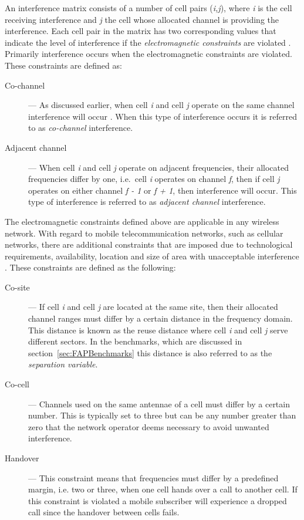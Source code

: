 An interference matrix consists of a number of cell pairs (\emph{i,j}), where \emph{i} is the cell receiving interference and \emph{j} the cell whose allocated channel is providing the interference\cite{Karen2004}. Each cell pair in the matrix has two corresponding values that indicate the level of interference if the \emph{electromagnetic constraints} are violated \cite{ACOvsEA,AndreasPaper}. 
Primarily interference occurs when the electromagnetic constraints are violated. These constraints are defined as:
\begin{description}
\item[Co-channel] --- As discussed earlier, when cell \emph{i} and cell \emph{j} operate on the same channel interference will occur \cite{GSMSysEngin,PrinciplesMobileCommunication}. When this type of interference occurs it is referred to as \emph{co-channel} interference.
\item[Adjacent channel] --- When cell \emph{i} and cell \emph{j} operate on adjacent frequencies, their allocated frequencies differ by one, i.e.\ cell \emph{i} operates on channel \emph{f}, then if cell \emph{j} operates on either channel \emph{f - 1} or \emph{f + 1}, then interference will occur\cite{GSMSysEngin,InterferenceOrientatedFAP}. This type of interference is referred to as \emph{adjacent channel} interference.
\end{description}

The electromagnetic constraints defined above are applicable in any wireless network. With regard to mobile telecommunication networks, such as cellular networks, there are additional constraints that are imposed due to technological requirements, availability, location and size of area with unacceptable interference \cite{Karen2004,Eisenblatter,AndreasPaper}. These constraints are defined as the following:
\begin{description}
\item[Co-site] --- If cell \emph{i} and cell \emph{j} are located at the same site, then their allocated channel ranges must differ by a certain distance in the frequency domain. This distance is known as the reuse distance where cell \emph{i} and cell \emph{j} serve different sectors\cite{FixedFAPPSO,EgyptFAPPSO}. In the benchmarks, which are discussed in section~\ref{sec:FAPBenchmarks} this distance is also referred to as the \emph{separation variable}. 
\item[Co-cell] --- Channels used on the same antennae of a cell must differ by a certain number. This is typically set to three but can be any number greater than zero that the network operator deems necessary to avoid unwanted interference\cite{Karen2004,Eisenblatter,AndreasPaper}.
\item[Handover] --- This constraint means that frequencies must differ by a predefined margin, i.e. two or three, when one cell hands over a call to another cell. If this constraint is violated a mobile subscriber will experience a dropped call since the handover between cells fails\cite{Karen2004,Eisenblatter,AndreasPaper}.
\end{description}

